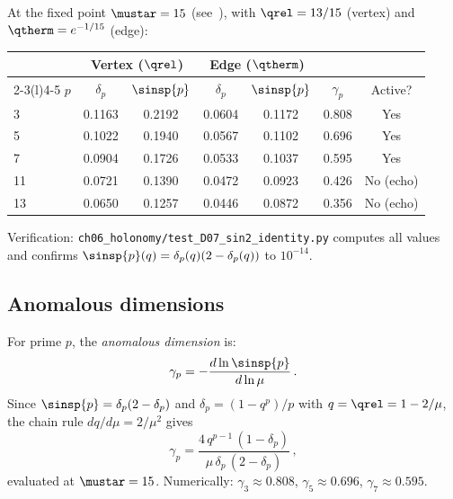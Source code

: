 \documentclass[12pt,a4paper]{article}
\begin{document}
At the fixed point $\mustar = 15$ (see~\cite{companion_M3}), with
$\qrel = 13/15$ (vertex) and $\qtherm = e^{-1/15}$ (edge):

\begin{center}
\begin{tabular}{lcccccc}
\toprule
& \multicolumn{2}{c}{\textbf{Vertex} ($\qrel$)} & \multicolumn{2}{c}{\textbf{Edge} ($\qtherm$)} & & \\
\cmidrule(r){2-3}\cmidrule(l){4-5}
$p$ & $\delta_p$ & $\sinsp{p}$ & $\delta_p$ & $\sinsp{p}$ & $\gamma_p$ & Active? \\
\midrule
3 & 0.1163 & 0.2192 & 0.0604 & 0.1172 & 0.808 & Yes \\
5 & 0.1022 & 0.1940 & 0.0567 & 0.1102 & 0.696 & Yes \\
7 & 0.0904 & 0.1726 & 0.0533 & 0.1037 & 0.595 & Yes \\
11 & 0.0721 & 0.1390 & 0.0472 & 0.0923 & 0.426 & No (echo) \\
13 & 0.0650 & 0.1257 & 0.0446 & 0.0872 & 0.356 & No (echo) \\
\bottomrule
\end{tabular}
\end{center}

Verification: \texttt{ch06\_holonomy/test\_D07\_sin2\_identity.py} computes all values
and confirms $\sinsp{p}(q) = \delta_p(q)(2-\delta_p(q))$ to $10^{-14}$.

\subsection{Anomalous dimensions}
\label{sec:anomalous_dim}

\begin{definition}
\label{def:anomalous_dim}
For prime $p$, the \emph{anomalous dimension} is:
\begin{equation}
  \gamma_p = -\frac{d \ln \sinsp{p}}{d \ln \mu}\,.
  \label{eq:gamma_p}
\end{equation}
Since $\sinsp{p} = \delta_p(2 - \delta_p)$ and
$\delta_p = (1 - q^p)/p$ with $q = \qrel = 1 - 2/\mu$,
the chain rule $dq/d\mu = 2/\mu^2$ gives
\begin{equation}
  \gamma_p
  = \frac{4\,q^{p-1}\,(1 - \delta_p)}
         {\mu\,\delta_p\,(2 - \delta_p)}\,,
  \label{eq:gamma_closed}
\end{equation}
evaluated at $\mustar = 15$.  Numerically: $\gamma_3 \approx 0.808$,
$\gamma_5 \approx 0.696$, $\gamma_7 \approx 0.595$.
\end{definition}
\end{document}
